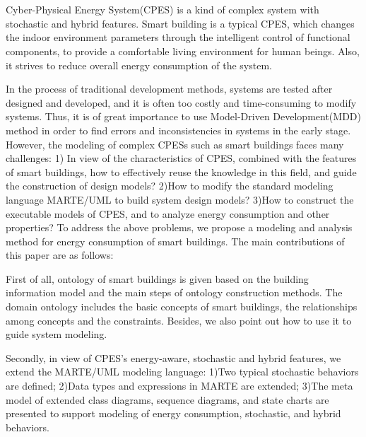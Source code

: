 \newpage
\vspace{-1cm}
\chapter*{}
\vspace{-0.5cm}
Cyber-Physical Energy System(CPES) is a kind of complex system with stochastic and hybrid features.
Smart building is a typical CPES, which changes the indoor environment parameters through the intelligent control of functional components, to provide a comfortable living environment for human beings. Also, it strives to reduce overall energy consumption of the system.

In the process of traditional development methods, systems are tested after designed and developed, and it is often too costly and time-consuming to modify systems. Thus, it is of great importance to use Model-Driven Development(MDD) method in order to find errors and inconsistencies in systems in the early stage. However, the modeling of complex CPESs such as smart buildings faces many challenges: 1) In view of the characteristics of CPES, combined with the features of smart buildings, how to effectively reuse the knowledge in this field, and guide the construction of design models? 2)How to modify the standard modeling language MARTE/UML to build system design models? 3)How to construct the executable models of CPES, and to analyze energy consumption and other properties?
To address the above problems, we propose a modeling and analysis method for energy consumption of smart buildings. The main contributions of this paper are as follows:

First of all, ontology of smart buildings is given based on the building information model and the main steps of ontology construction methods. The domain ontology includes the basic concepts of smart buildings, the relationships among concepts and the constraints. Besides, we also point out how to use it to guide system modeling.

Secondly, in view of CPES's energy-aware, stochastic and hybrid features, we extend the MARTE/UML modeling language: 1)Two typical stochastic behaviors are defined; 2)Data types and expressions in MARTE are extended; 3)The meta model of extended class diagrams, sequence diagrams, and state charts are presented to support modeling of energy consumption, stochastic, and hybrid behaviors.


